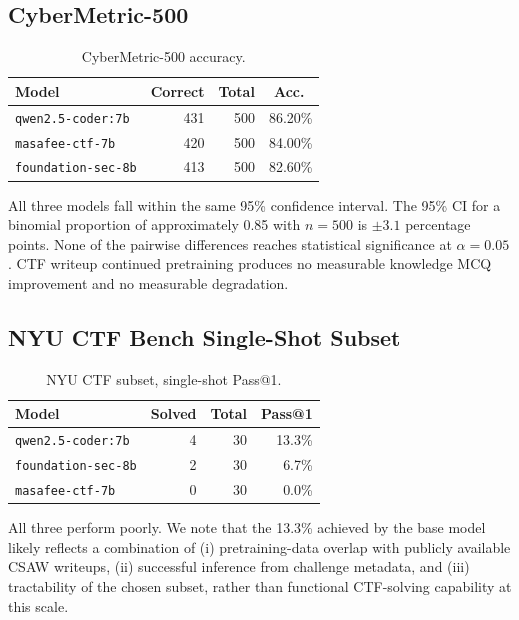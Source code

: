 \documentclass[10pt,twocolumn,a4paper]{article}
\begin{document}
\subsection{CyberMetric-500}

\begin{table}[h!]
\centering
\caption{CyberMetric-500 accuracy.}
\label{tab:cybermetric}
\small
\begin{tabular}{lrrr}
\toprule
Model & Correct & Total & Acc.\ \\
\midrule
\texttt{qwen2.5-coder:7b} & 431 & 500 & 86.20\% \\
\texttt{masafee-ctf-7b} & 420 & 500 & 84.00\% \\
\texttt{foundation-sec-8b} & 413 & 500 & 82.60\% \\
\bottomrule
\end{tabular}
\end{table}

All three models fall within the same 95\% confidence interval. The 95\% CI for a binomial proportion of approximately 0.85 with $n=500$ is $\pm 3.1$ percentage points. None of the pairwise differences reaches statistical significance at $\alpha = 0.05$. CTF writeup continued pretraining produces no measurable knowledge MCQ improvement and no measurable degradation.

\subsection{NYU CTF Bench Single-Shot Subset}

\begin{table}[h!]
\centering
\caption{NYU CTF subset, single-shot Pass@1.}
\label{tab:nyu}
\small
\begin{tabular}{lrrr}
\toprule
Model & Solved & Total & Pass@1 \\
\midrule
\texttt{qwen2.5-coder:7b} & 4 & 30 & 13.3\% \\
\texttt{foundation-sec-8b} & 2 & 30 & 6.7\% \\
\texttt{masafee-ctf-7b} & 0 & 30 & 0.0\% \\
\bottomrule
\end{tabular}
\end{table}

All three perform poorly. We note that the 13.3\% achieved by the base model likely reflects a combination of (i) pretraining-data overlap with publicly available CSAW writeups, (ii) successful inference from challenge metadata, and (iii) tractability of the chosen subset, rather than functional CTF-solving capability at this scale.
\end{document}
